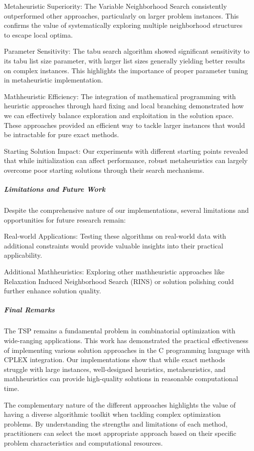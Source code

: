 \documentclass{article}
\begin{document}
Metaheuristic Superiority: The Variable Neighborhood Search consistently outperformed other approaches, particularly on larger problem instances. This confirms the value of systematically exploring multiple neighborhood structures to escape local optima.

Parameter Sensitivity: The tabu search algorithm showed significant sensitivity to its tabu list size parameter, with larger list sizes generally yielding better results on complex instances. This highlights the importance of proper parameter tuning in metaheuristic implementation.

Mathheuristic Efficiency: The integration of mathematical programming with heuristic approaches through hard fixing and local branching demonstrated how we can effectively balance exploration and exploitation in the solution space. These approaches provided an efficient way to tackle larger instances that would be intractable for pure exact methods.

Starting Solution Impact: Our experiments with different starting points revealed that while initialization can affect performance, robust metaheuristics can largely overcome poor starting solutions through their search mechanisms.

\subparagraph{Limitations and Future Work}
Despite the comprehensive nature of our implementations, several limitations and opportunities for future research remain:

Real-world Applications: Testing these algorithms on real-world data with additional constraints would provide valuable insights into their practical applicability.

Additional Mathheuristics: Exploring other mathheuristic approaches like Relaxation Induced Neighborhood Search (RINS) or solution polishing could further enhance solution quality.

\subparagraph{Final Remarks}
The TSP remains a fundamental problem in combinatorial optimization with wide-ranging applications. This work has demonstrated the practical effectiveness of 
implementing various solution approaches in the C programming language with CPLEX integration. Our implementations show that while exact methods struggle with large instances, 
well-designed heuristics, metaheuristics, and mathheuristics can provide high-quality solutions in reasonable computational time.

The complementary nature of the different approaches highlights the value of having a diverse algorithmic toolkit when tackling complex optimization problems. 
By understanding the strengths and limitations of each method, practitioners can select the most appropriate approach based on their specific problem characteristics and computational resources.

\newpage


\end{document}
